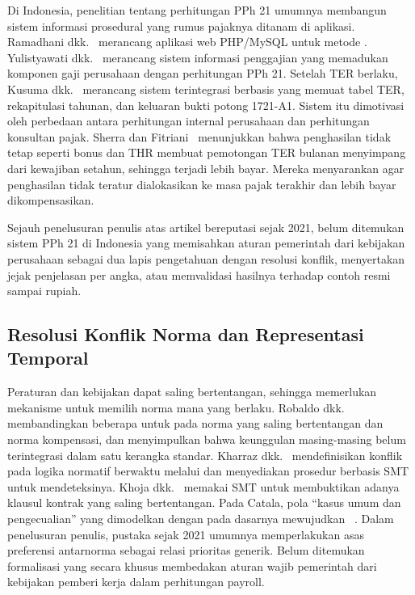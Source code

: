 Di Indonesia, penelitian tentang perhitungan PPh 21 umumnya membangun sistem informasi prosedural yang rumus pajaknya ditanam di aplikasi. Ramadhani dkk.~\cite{ramadhani2021grossup} merancang aplikasi web PHP/MySQL untuk metode . Yulistyawati dkk.~\cite{yulistyawati2022payroll} merancang sistem informasi penggajian yang memadukan komponen gaji perusahaan dengan perhitungan PPh 21. Setelah TER berlaku, Kusuma dkk.~\cite{kusuma2026pph21} merancang sistem terintegrasi berbasis  yang memuat tabel TER, rekapitulasi tahunan, dan keluaran bukti potong 1721-A1. Sistem itu dimotivasi oleh perbedaan antara perhitungan internal perusahaan dan perhitungan konsultan pajak. Sherra dan Fitriani~\cite{sherra2025ter} menunjukkan bahwa penghasilan tidak tetap seperti bonus dan THR membuat pemotongan TER bulanan menyimpang dari kewajiban setahun, sehingga terjadi lebih bayar. Mereka menyarankan agar penghasilan tidak teratur dialokasikan ke masa pajak terakhir dan lebih bayar dikompensasikan.

Sejauh penelusuran penulis atas artikel bereputasi sejak 2021, belum ditemukan sistem PPh 21 di Indonesia yang memisahkan aturan pemerintah dari kebijakan perusahaan sebagai dua lapis pengetahuan dengan resolusi konflik, menyertakan jejak penjelasan per angka, atau memvalidasi hasilnya terhadap contoh resmi sampai rupiah.

\subsection{Resolusi Konflik Norma dan Representasi Temporal}

Peraturan dan kebijakan dapat saling bertentangan, sehingga  memerlukan mekanisme untuk memilih norma mana yang berlaku. Robaldo dkk.~\cite{robaldo2024compliance} membandingkan beberapa  untuk  pada norma yang saling bertentangan dan norma kompensasi, dan menyimpulkan bahwa keunggulan masing-masing  belum terintegrasi dalam satu kerangka standar. Kharraz dkk.~\cite{kharraz2024conflicts} mendefinisikan konflik pada logika normatif berwaktu melalui  dan menyediakan prosedur berbasis SMT untuk mendeteksinya. Khoja dkk.~\cite{khoja2026consistency} memakai  SMT untuk membuktikan adanya klausul kontrak yang saling bertentangan. Pada Catala, pola ``kasus umum dan pengecualian'' yang dimodelkan dengan  pada dasarnya mewujudkan ~\cite{merigoux2021catala}. Dalam penelusuran penulis, pustaka sejak 2021 umumnya memperlakukan asas preferensi antarnorma sebagai relasi prioritas generik. Belum ditemukan formalisasi yang secara khusus membedakan aturan wajib pemerintah dari kebijakan pemberi kerja dalam perhitungan payroll.

